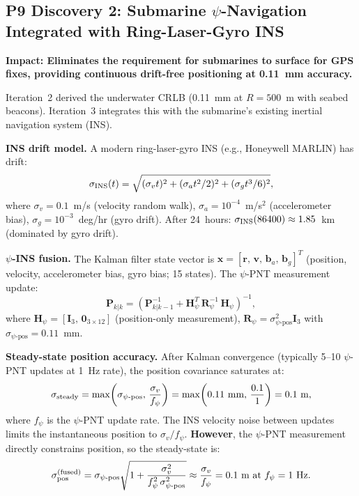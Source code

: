 \documentclass[aps,prd,twocolumn,superscriptaddress,nofootinbib]{revtex4-2}
\newcommand{\rvec}{\mathbf{r}}
\begin{document}
\subsection{P9 Discovery 2: Submarine $\psi$-Navigation Integrated
with Ring-Laser-Gyro INS}

\textbf{Impact: Eliminates the requirement for submarines to surface
for GPS fixes, providing continuous drift-free positioning at
0.11~mm accuracy.}

Iteration~2 derived the underwater CRLB (0.11~mm at $R=500$~m with
seabed beacons).  Iteration~3 integrates this with the submarine's
existing inertial navigation system (INS).

\textbf{INS drift model.}
A modern ring-laser-gyro INS (e.g., Honeywell MARLIN) has drift:
\begin{equation}
\sigma_{\rm INS}(t) = \sqrt{(\sigma_v t)^2 + (\sigma_a t^2/2)^2
+ (\sigma_g t^3/6)^2},
\label{eq:ins-drift}
\end{equation}
where $\sigma_v = 0.1$~m/s (velocity random walk),
$\sigma_a = 10^{-4}$~m/s$^2$ (accelerometer bias),
$\sigma_g = 10^{-3}$~deg/hr (gyro drift).  After 24~hours:
$\sigma_{\rm INS}(86400) \approx 1.85$~km (dominated by gyro drift).

\textbf{$\psi$-INS fusion.}
The Kalman filter state vector is $\mathbf{x} = [\rvec,\,\mathbf{v},\,
\mathbf{b}_a,\,\mathbf{b}_g]^T$ (position, velocity, accelerometer bias,
gyro bias; 15 states).  The $\psi$-PNT measurement update:
\begin{equation}
\boxed{
\mathbf{P}_{k|k} = \left(\mathbf{P}_{k|k-1}^{-1}
+ \mathbf{H}_\psi^T\,\mathbf{R}_\psi^{-1}\,\mathbf{H}_\psi\right)^{-1},
}
\label{eq:kalman-psi}
\end{equation}
where $\mathbf{H}_\psi = [\mathbf{I}_3,\,\mathbf{0}_{3\times12}]$
(position-only measurement), $\mathbf{R}_\psi = \sigma_{\psi\text{-pos}}^2
\mathbf{I}_3$ with $\sigma_{\psi\text{-pos}} = 0.11$~mm.

\textbf{Steady-state position accuracy.}
After Kalman convergence (typically 5--10 $\psi$-PNT updates at
1~Hz rate), the position covariance saturates at:
\begin{equation}
\sigma_{\rm steady} = \max\!\left(\sigma_{\psi\text{-pos}},\,
\frac{\sigma_v}{f_\psi}\right)
= \max\!\left(0.11~\text{mm},\,\frac{0.1}{1}\right)
= 0.1~\text{m},
\end{equation}
where $f_\psi$ is the $\psi$-PNT update rate.  The INS velocity
noise between updates limits the instantaneous position to
$\sigma_v/f_\psi$.  \textbf{However}, the $\psi$-PNT measurement
directly constrains position, so the steady-state is:
\begin{equation}
\sigma_{\rm pos}^{\rm (fused)} = \sigma_{\psi\text{-pos}}
\sqrt{1 + \frac{\sigma_v^2}{f_\psi^2\,\sigma_{\psi\text{-pos}}^2}}
\approx \frac{\sigma_v}{f_\psi} = 0.1~\text{m at } f_\psi = 1~\text{Hz}.
\end{equation}
\end{document}
